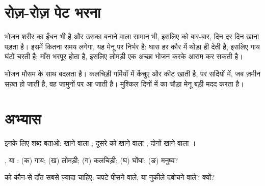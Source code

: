 \section{रोज़-रोज़ पेट भरना}

\begin{proposition}[खाना रोज़ का काम है]\label{prop:g2:what-animals-eat:daily}
भोजन शरीर का ईंधन भी है और उसका बनाने वाला सामान भी, इसलिए  को
बार-बार, दिन दर दिन खाना पड़ता है। इसमें कितना समय लगेगा, यह मेनू पर
निर्भर है: घास हर कौर में थोड़ा ही देती है, इसलिए गाय घंटों चरती है;
माँस भरपूर होता है, इसलिए लोमड़ी एक अच्छा भोजन करके आराम कर सकती है।
\end{proposition}
\admitted

\begin{example}[सर्दी मेनू बदल देती है]\label{ex:g2:what-animals-eat:winter}
भोजन मौसम के साथ बदलता है। कलचिड़ी गर्मियों में केंचुए और कीट खाती है,
पर सर्दियों में, जब ज़मीन सख़्त हो जाती है, वह जामुनों पर आ जाती है।
मुश्किल दिनों में  का चौड़ा मेनू बड़ी मदद करता है।
\end{example}

\section{अभ्यास}

\begin{exercise}[$\star$]\label{exo:g2:what-animals-eat:1}
इनके लिए शब्द बताओ:  खाने वाला ; दूसरे  को खाने वाला
; दोनों खाने वाला ।
\end{exercise}

\begin{exercise}[$\star$]\label{exo:g2:what-animals-eat:2}
,  या : (क) गाय; (ख) लोमड़ी; (ग) कलचिड़ी;
(घ) घोंघा; (ङ) मनुष्य?
\end{exercise}

\begin{exercise}[$\star$]\label{exo:g2:what-animals-eat:3}
 को कौन-से दाँत सबसे ज़्यादा चाहिए: चपटे पीसने वाले, या नुकीले
दबोचने वाले? क्यों?
\end{exercise}


